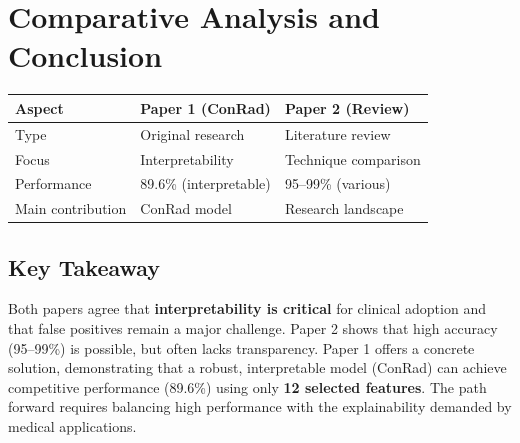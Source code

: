 \documentclass[10pt,a4paper]{article}
\begin{document}
\section{Comparative Analysis and Conclusion}

\begin{table}[h]
    \centering
    \begin{tabular}{lll}
        \toprule
        \textbf{Aspect} & \textbf{Paper 1 (ConRad)} & \textbf{Paper 2 (Review)} \\
        \midrule
        Type & Original research & Literature review \\
        Focus & Interpretability & Technique comparison \\
        Performance & 89.6\% (interpretable) & 95--99\% (various) \\
        Main contribution & ConRad model & Research landscape \\
        \bottomrule
    \end{tabular}
\end{table}
\vspace{-0.3cm}

\subsection{Key Takeaway}
Both papers agree that \textbf{interpretability is critical} for clinical adoption and that false positives remain a major challenge. Paper 2 shows that high accuracy (95--99\%) is possible, but often lacks transparency. Paper 1 offers a concrete solution, demonstrating that a robust, interpretable model (ConRad) can achieve competitive performance (89.6\%) using only \textbf{12 selected features}. The path forward requires balancing high performance with the explainability demanded by medical applications.
\end{document}
